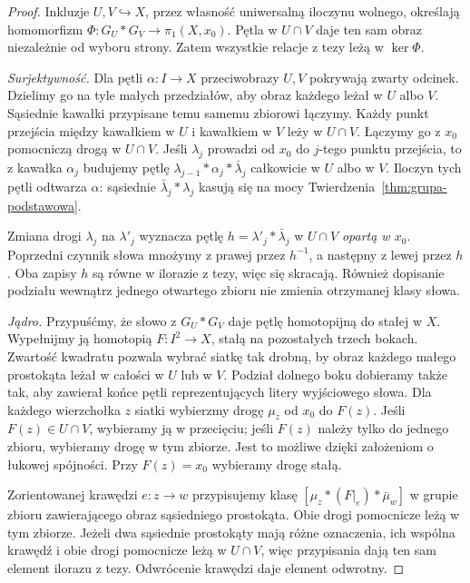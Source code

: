 \begin{proof}
Inkluzje $U,V\hookrightarrow X$, przez własność uniwersalną
iloczynu wolnego, określają homomorfizm
$\Phi:G_U*G_V\to\pi_1(X,x_0)$.
Pętla w $U\cap V$ daje ten sam obraz
niezależnie od wyboru strony.
Zatem wszystkie relacje z tezy
leżą w $\ker\Phi$.

\emph{Surjektywność.} Dla pętli
$\alpha:I\to X$ przeciwobrazy $U,V$
pokrywają zwarty odcinek. Dzielimy
go na tyle małych przedziałów,
aby obraz każdego leżał w $U$ albo $V$.
Sąsiednie kawałki przypisane temu
samemu zbiorowi łączymy. Każdy
punkt przejścia między kawałkiem
w $U$ i kawałkiem w $V$ leży w
$U\cap V$. Łączymy go z $x_0$
pomocniczą drogą w $U\cap V$.
Jeśli $\lambda_j$ prowadzi od $x_0$
do $j$-tego punktu przejścia,
to z kawałka $\alpha_j$ budujemy
pętlę $\lambda_{j-1}*\alpha_j*
\bar\lambda_j$ całkowicie w $U$
albo w $V$. Iloczyn tych pętli
odtwarza $\alpha$: sąsiednie
$\bar\lambda_j*\lambda_j$
kasują się na mocy
Twierdzenia~\ref{thm:grupa-podstawowa}.

Zmiana drogi $\lambda_j$ na $\lambda'_j$
wyznacza pętlę $h=\lambda'_j*\bar\lambda_j$ w $U\cap V$
\emph{opartą w $x_0$}. Poprzedni czynnik słowa mnożymy z prawej
przez $h^{-1}$, a następny z lewej przez $h$.
Oba zapisy $h$ są równe w ilorazie z tezy, więc się skracają.
Również dopisanie podziału wewnątrz
jednego otwartego zbioru nie zmienia
otrzymanej klasy słowa.

\emph{Jądro.} Przypuśćmy, że słowo
z $G_U*G_V$ daje pętlę homotopijną
do stałej w $X$. Wypełnijmy ją
homotopią $F:I^2\to X$, stałą na
pozostałych trzech bokach.
Zwartość kwadratu pozwala wybrać
siatkę tak drobną, by obraz
każdego małego prostokąta leżał
w całości w $U$ lub w $V$.
Podział dolnego boku dobieramy także tak, aby zawierał końce
pętli reprezentujących litery wyjściowego słowa.
Dla każdego wierzchołka $z$ siatki wybierzmy drogę $\mu_z$
od $x_0$ do $F(z)$. Jeśli $F(z)\in U\cap V$, wybieramy ją
w przecięciu; jeśli $F(z)$ należy tylko do jednego zbioru,
wybieramy drogę w tym zbiorze. Jest to możliwe dzięki założeniom
o łukowej spójności. Przy $F(z)=x_0$ wybieramy drogę stałą.

Zorientowanej krawędzi $e:z\to w$ przypisujemy klasę
$[\mu_z*(F|_e)*\bar\mu_w]$ w grupie zbioru zawierającego
obraz sąsiedniego prostokąta. Obie drogi pomocnicze leżą w tym
zbiorze. Jeżeli dwa sąsiednie prostokąty mają różne oznaczenia,
ich wspólna krawędź i obie drogi pomocnicze leżą w $U\cap V$,
więc przypisania dają ten sam element ilorazu z tezy.
Odwrócenie krawędzi daje element odwrotny.


\end{proof}
